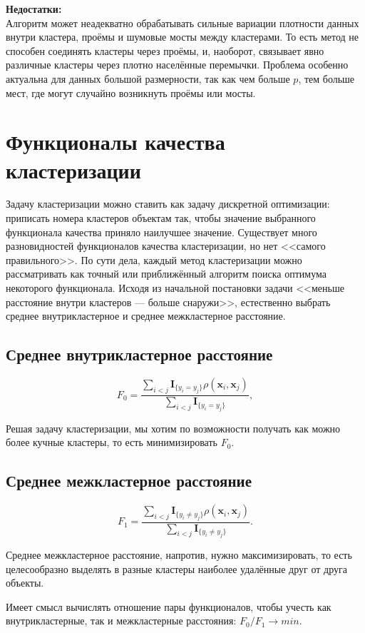 \documentclass[10pt]{article}
\begin{document}
\textbf{Недостатки:}\\ 
	Алгоритм может неадекватно обрабатывать сильные вариации плотности данных внутри кластера, проёмы и шумовые мосты между кластерами.
	То есть метод не способен соединять кластеры через проёмы, и, наоборот, связывает явно различные кластеры через плотно населённые перемычки. Проблема особенно актуальна для данных большой размерности, так как чем больше $p$, тем больше мест, где могут случайно возникнуть проёмы или мосты. 
\section{Функционалы качества кластеризации}

Задачу кластеризации можно ставить как задачу дискретной оптимизации:
приписать номера кластеров объектам так, чтобы значение выбранного функционала качества приняло наилучшее значение.
Существует много разновидностей функционалов качества кластеризации, но нет <<самого правильного>>. По сути дела, каждый метод кластеризации можно рассматривать как точный или приближённый алгоритм поиска оптимума некоторого функционала.	
Исходя из начальной постановки задачи <<меньше расстояние внутри кластеров --- больше снаружи>>, естественно выбрать среднее внутрикластерное и среднее межкластерное расстояние.

\subsection{Среднее внутрикластерное расстояние}
$$F_0 = \frac{\sum_{i < j}\mathbf{I}_{\{y_i = y_j\}}\rho(\pmb x_i, \pmb x_j)}{\sum_{i < j}\mathbf{I}_{\{y_i = y_j\}}},$$ 

Решая задачу кластеризации, мы хотим по возможности получать как можно более кучные кластеры, то есть минимизировать $F_0$.

\subsection{Среднее межкластерное расстояние}

$$F_1 = \frac{\sum_{i < j}\mathbf{I}_{\{y_i \neq y_j\}}\rho(\pmb x_i, \pmb x_j)}{\sum_{i < j}\mathbf{I}_{\{y_i \neq y_j\}}}.$$

Среднее межкластерное расстояние, напротив, нужно максимизировать, то есть целесообразно выделять в разные кластеры наиболее удалённые друг от друга объекты.

Имеет смысл вычислять отношение пары функционалов, чтобы учесть как внутрикластерные, так и межкластерные расстояния: $F_0/F_1 \rightarrow min$.
\end{document}
